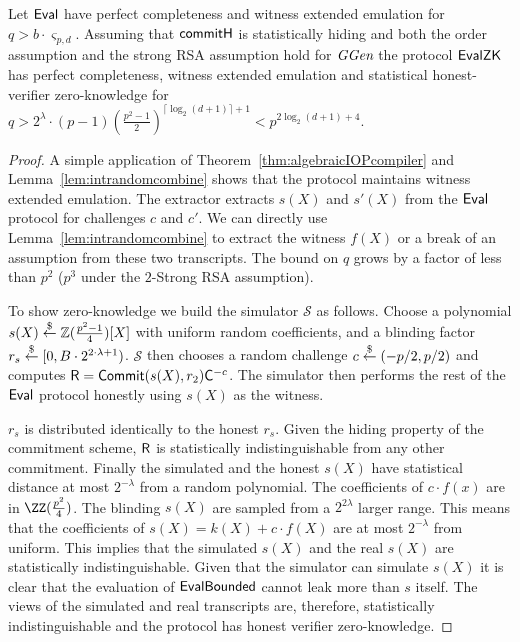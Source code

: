 \begin{theorem}
Let $\textsf{{Eval}}$ have perfect completeness and witness extended emulation for $q> b\cdot \boldsymbol{\varsigma}_{p, d}$. Assuming that $\textsf{{commitH}}$ is statistically hiding and both the order assumption and the strong RSA assumption hold for $\textit{GGen}$ the protocol $\textsf{{EvalZK}}$ has perfect completeness, witness extended emulation and statistical honest-verifier zero-knowledge for $q>2^\lambda\cdot (p-1)(\frac{p^2-1}{2})^{\lceil \log_2(d+1)\rceil+1}<p^{2\log_2(d+1)+4}$.
\end{theorem}

\begin{proof}
A simple application of Theorem~\ref{thm:algebraicIOPcompiler} and Lemma~\ref{lem:intrandomcombine} shows that the protocol maintains witness extended emulation. The extractor extracts $s(X)$ and $s'(X)$ from the $\textsf{{Eval}}$ protocol for challenges $c$ and $c'$. We can directly use Lemma~\ref{lem:intrandomcombine} to extract the witness $f(X)$ or a break of an assumption from these two transcripts. The bound on $q$ grows by a factor of less than $p^2$ ($p^3$ under the $2$-Strong RSA assumption).   

To show zero-knowledge we build the simulator $\mathcal{S}$ as follows. Choose a polynomial $s(X) \overset{\$}{\gets} \mathbb{Z}(\frac{p^2-1}{4})[X]$ with uniform random coefficients, and a blinding factor $r_s\overset{\$}{\gets} [0,B\cdot 2^{2\cdot\lambda+1})$. $\mathcal{S}$ then chooses a random challenge $c\overset{\$}{\gets} (-p/2,p/2)$ and computes $\mathsf{R}=\textsf{{Commit}}(s(X),r_2)\mathsf{C}^{-c}$. The simulator then performs the rest of the $\textsf{{Eval}}$ protocol honestly using $s(X)$ as the witness. 

$r_s$ is distributed identically to the honest $r_s$. Given the hiding property of the commitment scheme, $\mathsf{R}$ is statistically indistinguishable from any other commitment. Finally the simulated and the honest $s(X)$ have statistical distance at most $2^{-\lambda}$ from a random polynomial. The coefficients of $c\cdot f(x)$ are in $\ZZ(\frac{p^2}{4})$. The blinding $s(X)$ are sampled from a $2^{2\lambda}$ larger range. This means that the coefficients of $s(X)=k(X)+c\cdot f(X)$ are at most $2^{-\lambda}$ from uniform. This implies that the simulated $s(X)$ and the real $s(X)$ are statistically indistinguishable. Given that the simulator can simulate $s(X)$ it is clear that the evaluation of $\textsf{{EvalBounded}}$ cannot leak more than $s$ itself. The views of the simulated and real transcripts are, therefore, statistically indistinguishable and the protocol has honest verifier zero-knowledge.
\end{proof}